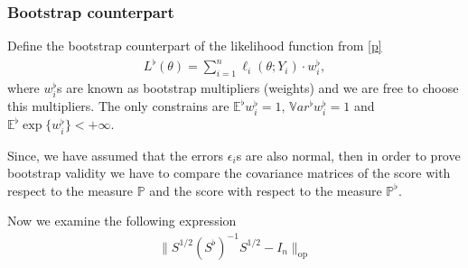 \documentclass[12pt]{article}
\renewcommand{\=}[1]{\stackrel{#1}{=}} %
\providecommand{\e}{\epsilon}
\begin{document}
\subsubsection{Bootstrap counterpart} 
Define the bootstrap counterpart of the likelihood function from \eqref{p}
\begin{align}\label{p^b}
L^{\flat}(\theta) = \sum_{i=1}^n \ell_i (\theta; Y_i) \cdot w_i^{\flat},
\end{align}
where $w_i^{\flat}$s are known as bootstrap multipliers (weights) and we are free to choose this multipliers. The only constrains are $\mathbb{E}^{\flat}w_i^{\flat} = 1, \, \mathbb{V}ar^{\flat} w_i^{\flat} = 1$ and $\mathbb{E}^{\flat}\exp\{w_i^{\flat}\} < +\infty$.
\par Since, we have assumed that the errors $\e_i$s are also normal, then in order to prove bootstrap validity we have to compare the covariance matrices of the score with respect to the measure $\mathbb{P}$ and the score with respect to the measure $\mathbb{P}^{\flat}$. 
\par Now we examine the following expression 
\begin{align}
\|S^{1/2} (S^{\flat})^{-1} S^{1/2} - I_n \|_{\text{op}}
\end{align}
\end{document}
